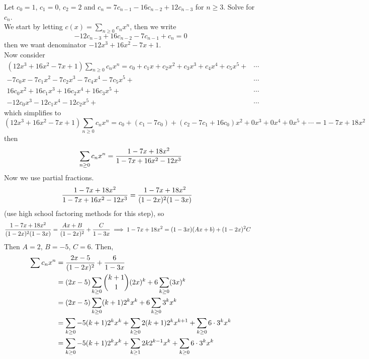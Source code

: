 \documentclass[english, 11pt]{article}
\begin{document}
       \begin{exmp}
         Let $c_0 = 1$, $c_1 = 0$, $c_2 = 2$ and $c_n = 7c_{n-1} - 16c_{n-2} + 12c_{n-3}$ for $n \geq 3$. Solve for $c_n$. \\

         We start by letting $c(x) = \sum_{n \geq 0} c_nx^n$, then we write
         \[ -12c_{n-3} + 16c_{n-2} - 7c_{n-1} + c_n = 0 \]
         then we want denominator $-12x^3 + 16x^2 - 7x + 1$. \\

         Now consider
         \begin{align*}
           (12x^3 + 16x^2 - 7x + 1) \sum_{n \geq 0} c_nx^n = c_0 + c_1x + c_2x^2 + c_3x^3 + c_4x^4 + c_5x^5 + & \cdots \\
           -7c_0x - 7c_1x^2 - 7c_2x^3 - 7c_4x^4 - 7c_5x^5 + & \cdots \\
           16c_0x^2 + 16c_1x^3 + 16c_2x^4 + 16c_3x^5 + & \cdots \\
           -12c_0x^3 - 12c_1x^4 - 12c_2x^5 + & \cdots
         \end{align*}
         which simplifies to
         \[ (12x^3 + 16x^2 - 7x + 1) \sum_{n \geq 0} c_nx^n = c_0 + (c_1 - 7c_0) + (c_2 - 7c_1 + 16c_0)x^2 + 0x^3 + 0x^4 + 0x^5 + \cdots = 1 - 7x + 18x^2 \]
         then
         \[ \sum_{n \geq 0} c_nx^n = \frac{1-7x+18x^2}{1-7x+16x^2 - 12x^3} \]
         Now we use partial fractions.
         \begin{align*}
           \frac{1-7x+18x^2}{1-7x+16x^2 - 12x^3} & = \frac{1-7x + 18x^2}{(1-2x)^2(1-3x)}
         \end{align*}
         (use high school factoring methods for this step), so
         \begin{align*}
           \frac{1-7x + 18x^2}{(1-2x)^2(1-3x)} & = \frac{Ax+B}{(1-2x)^2} + \frac{C}{1-3x} \implies 1 -7x + 18x^2 = (1-3x)(Ax+b) + (1-2x)^2 C
         \end{align*}
         Then $A = 2$, $B = -5$, $C = 6$. Then,
         \begin{align*}
           \sum c_n x^n & =  \f{2x -5}{(1-2x)^2} + \f{6}{1-3x} \\
           & = (2x-5) \sum_{k \geq 0} \comb{k+1}{1} (2x)^k + 6\sum_{k \geq 0} (3x)^k \\
           & = (2x-5) \sum_{k \geq 0} (k+1)2^kx^k + 6\sum_{k \geq 0} 3^kx^k \\
           & = \sum_{k \geq 0} -5(k+1)2^kx^k + \sum_{k \geq 0}2(k+1)2^kx^{k+1} + \sum_{k \geq 0} 6 \cdot 3^k x^k \\
           & = \sum_{k \geq 0} -5(k+1)2^kx^k + \sum_{k \geq 1}2k2^{k-1}x^{k} + \sum_{k \geq 0} 6 \cdot 3^k x^k

\end{align*}
\end{exmp}
\end{document}
